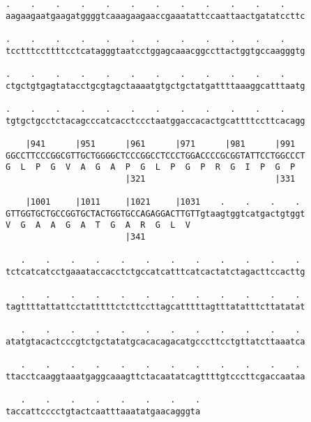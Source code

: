 \documentclass{article}
\begin{document}
\begin{Verbatim}
.    .    .    .    .    .    .    .    .    .    .    .    
aagaagaatgaagatggggtcaaagaagaaccgaaatattccaattaactgatatccttc
                                                            
.    .    .    .    .    .    .    .    .    .    .    .    
tcctttccttttcctcatagggtaatcctggagcaaacggccttactggtgccaagggtg
                                                            
.    .    .    .    .    .    .    .    .    .    .    .    
ctgctgtgagtatacctgcgtagctaaaatgtgctgctatgattttaaaggcatttaatg
                                                            
.    .    .    .    .    .    .    .    .    .    .    .    
tgtgctgcctctacagcccatcacctccctaatggaccacactgcattttccttcacagg
                                                            
    |941      |951      |961      |971      |981      |991  
GGCCTTCCCGGCGTTGCTGGGGCTCCCGGCCTCCCTGGACCCCGCGGTATTCCTGGCCCT
G  L  P  G  V  A  G  A  P  G  L  P  G  P  R  G  I  P  G  P  
                        |321                          |331  
  
    |1001     |1011     |1021     |1031    .    .    .    . 
GTTGGTGCTGCCGGTGCTACTGGTGCCAGAGGACTTGTTgtaagtggtcatgactgtggt
V  G  A  A  G  A  T  G  A  R  G  L  V                       
                        |341                                
  
   .    .    .    .    .    .    .    .    .    .    .    . 
tctcatcatcctgaaataccacctctgccatcatttcatcactatctagacttccacttg
                                                            
   .    .    .    .    .    .    .    .    .    .    .    . 
tagttttattattcctatttttctcttccttagcatttttagtttatatttcttatatat
                                                            
   .    .    .    .    .    .    .    .    .    .    .    . 
atatgtacactcccgtctgctatatgcacacagacatgcccttcctgttatcttaaatca
                                                            
   .    .    .    .    .    .    .    .    .    .    .    . 
ttacctcaaggtaaatgaggcaaagttctacaatatcagttttgtcccttcgaccaataa
                                                            
   .    .    .    .    .    .    .    .
taccattcccctgtactcaatttaaatatgaacagggta
                                       
                                       
 

\end{Verbatim}
\end{document}
